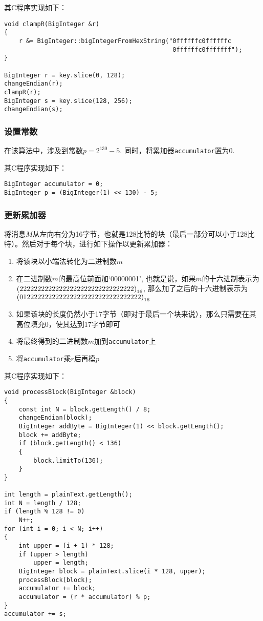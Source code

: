其C程序实现如下：
\begin{prove}
	\begin{verbatim}
void clampR(BigInteger &r)
{
    r &= BigInteger::bigIntegerFromHexString("0ffffffc0ffffffc
                                              0ffffffc0fffffff");
}

BigInteger r = key.slice(0, 128);
changeEndian(r);
clampR(r);
BigInteger s = key.slice(128, 256);
changeEndian(s);
	\end{verbatim}
\end{prove}
\subsubsection{设置常数}
在该算法中，涉及到常数$p=2^{130}-5$. 同时，将累加器\verb`accumulator`置为0.\par
其C程序实现如下：
\begin{prove}
	\begin{verbatim}
BigInteger accumulator = 0;
BigInteger p = (BigInteger(1) << 130) - 5;
	\end{verbatim}
\end{prove}
\subsubsection{更新累加器}
将消息$M$从左向右分为16字节，也就是128比特的块（最后一部分可以小于128比特）。然后对于每个块，进行如下操作以更新累加器：
\begin{enumerate}
	\item 将该块以小端法转化为二进制数$m$
	\item 在二进制数$m$的最高位前面加`00000001', 也就是说，如果$m$的十六进制表示为\\$\left( {22222222222222222222222222222222}\right)_{16}$, 那么加了之后的十六进制表示为\\$\left( {0122222222222222222222222222222222}\right)_{16}$
	\item 如果该块的长度仍然小于17字节（即对于最后一个块来说），那么只需要在其高位填充0，使其达到17字节即可
	\item 将最终得到的二进制数$m$加到\verb`accumulator`上
	\item 将\verb`accumulator`乘$r$后再模$p$
\end{enumerate}

其C程序实现如下：
\begin{prove}
	\begin{verbatim}
void processBlock(BigInteger &block)
{
    const int N = block.getLength() / 8;
    changeEndian(block);
    BigInteger addByte = BigInteger(1) << block.getLength();
    block += addByte;
    if (block.getLength() < 136)
    {
        block.limitTo(136);
    }
}

int length = plainText.getLength();
int N = length / 128;
if (length % 128 != 0)
	N++;
for (int i = 0; i < N; i++)
{
	int upper = (i + 1) * 128;
	if (upper > length)
		upper = length;
	BigInteger block = plainText.slice(i * 128, upper);
	processBlock(block);
	accumulator += block;
	accumulator = (r * accumulator) % p;
}
accumulator += s;
	\end{verbatim}
\end{prove}
